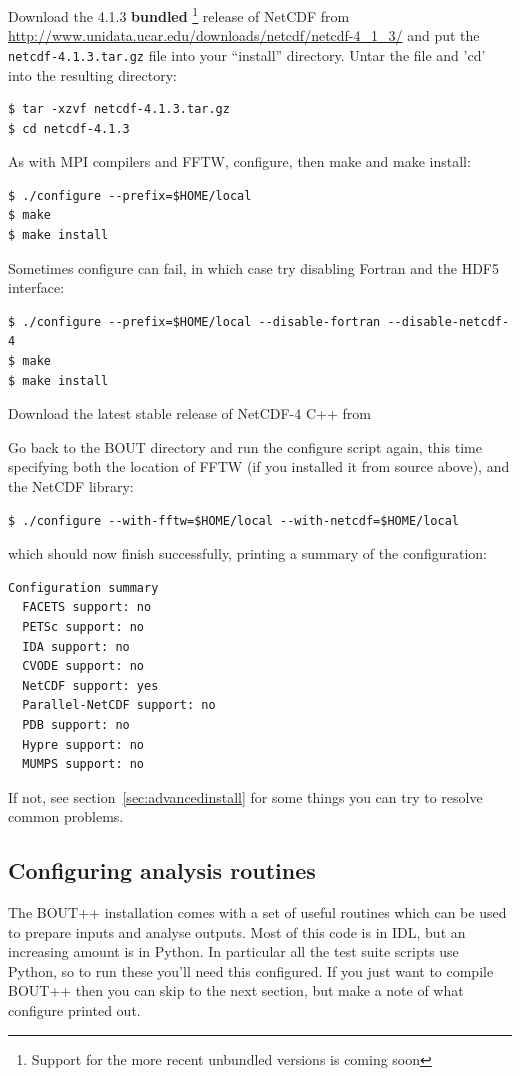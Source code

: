 \documentclass[12pt]{article}
\begin{document}
Download the 4.1.3 {\bf bundled}
%
\footnote{Support for the more recent unbundled versions is coming soon}
release of NetCDF from
\url{http://www.unidata.ucar.edu/downloads/netcdf/netcdf-4_1_3/} and put the
\texttt{netcdf-4.1.3.tar.gz} file into your ``install'' directory. Untar the
file and 'cd' into the resulting directory:
%
\begin{verbatim}
$ tar -xzvf netcdf-4.1.3.tar.gz
$ cd netcdf-4.1.3
\end{verbatim}
%
As with MPI compilers and FFTW, configure, then make and make install:
%
\begin{verbatim}
$ ./configure --prefix=$HOME/local
$ make
$ make install
\end{verbatim}
%
Sometimes configure can fail, in which case try disabling Fortran and the HDF5
interface:
%
\begin{verbatim}
$ ./configure --prefix=$HOME/local --disable-fortran --disable-netcdf-4
$ make
$ make install
\end{verbatim}
%
Download the latest stable release of NetCDF-4 C++ from

Go back to the BOUT directory and run the configure script again, this time
specifying both the location of FFTW (if you installed it from source above),
and the NetCDF library:
%
\begin{verbatim}
$ ./configure --with-fftw=$HOME/local --with-netcdf=$HOME/local
\end{verbatim}
%
which should now finish successfully, printing a summary of the configuration:
%
\begin{verbatim}
Configuration summary
  FACETS support: no
  PETSc support: no
  IDA support: no
  CVODE support: no
  NetCDF support: yes
  Parallel-NetCDF support: no
  PDB support: no
  Hypre support: no
  MUMPS support: no
\end{verbatim}
%
If not, see section~\ref{sec:advancedinstall} for some things you can try to
resolve common problems.



\subsection{Configuring analysis routines}
%
\label{sec:configanalysis}
%
The BOUT++ installation comes with a set of useful routines which can be used
to prepare inputs and analyse outputs. Most of this code is in IDL, but an
increasing amount is in Python. In particular all the test suite scripts use
Python, so to run these you'll need this configured.  If you just want to
compile BOUT++ then you can skip to the next section, but make a note of what
configure printed out.
\end{document}
